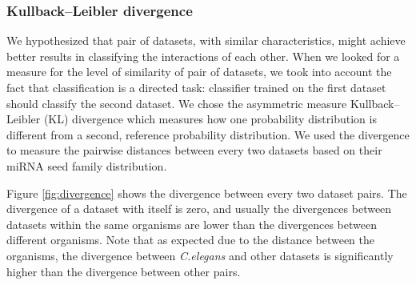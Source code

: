 \documentclass{bmcart}
\begin{document}
\subsubsection*{Kullback–Leibler divergence}
We hypothesized that pair of datasets, with similar characteristics, might achieve better results in classifying the interactions of each other. When we looked for a  measure for the level of similarity of pair of datasets, we took into account the fact that classification is a directed task: classifier trained on the first dataset should classify the second dataset. 
We chose the asymmetric measure Kullback–Leibler (KL) divergence which measures how one probability distribution is different from a second, reference probability distribution. We used the divergence to measure the pairwise distances between every two datasets based on their miRNA seed family distribution.

Figure \ref{fig:divergence} shows the divergence between every two dataset pairs. The divergence of a dataset with itself is zero, and usually the divergences between datasets within the same organisms are lower than the divergences between different organisms. Note that as expected due to the distance between the organisms, the divergence between \textit{C.elegans }and other datasets is significantly higher than the divergence between other pairs.

\end{document}
